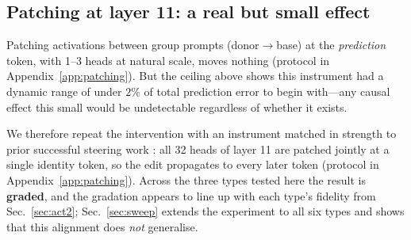 \subsection{Patching at layer 11: a real but small effect}
\label{sec:weakinstrument}
Patching \starhead{} activations between group prompts (donor$\to$base) at
the \emph{prediction} token, with 1--3 heads at natural scale, moves
nothing (protocol in Appendix~\ref{app:patching}). But the ceiling above
shows this instrument had a dynamic range of under $2\%$ of total
prediction error to begin with---any causal effect this small would be
undetectable regardless of whether it exists.

\label{sec:v2}
We therefore repeat the intervention with an instrument matched in
strength to prior successful steering work \citep{llmopinions2026}: all
32 heads of layer 11 are patched jointly at a single identity token, so
the edit propagates to every later token (protocol in
Appendix~\ref{app:patching}). Across the three types tested here the
result is \textbf{graded}, and the gradation appears to line up with
each type's fidelity from Sec.~\ref{sec:act2}; Sec.~\ref{sec:sweep}
extends the experiment to all six types and shows that this alignment
does \emph{not} generalise.

\begin{table}[t]
\centering
\caption{Causal patching results with the strong instrument. Ceiling =
mean full-prompt-swap shift (Sec.~\ref{sec:ceiling}, this instrument's
question set). Shift = mean directional shift toward the target group's
true distribution; \% of ceiling in parentheses where meaningful.
$p_{\text{item}}$ = Wilcoxon vs.\ random-head control over 240 items
(descriptive; items are clustered); $p_{\text{pair}}$ = exact sign-flip
over the 12 pairs (primary).}
\label{tab:patchv2}
\end{table}

